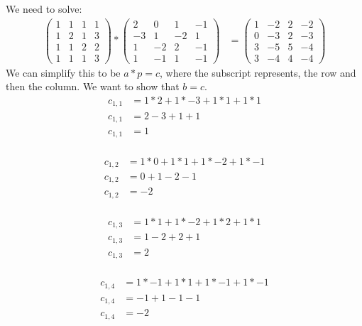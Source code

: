 \documentclass[12pt]{article}
\begin{document}
\begin{itemize}
We need to solve: 
\begin{align*}
    \begin{pmatrix}
    1 & 1 & 1 & 1\\
    1 & 2 & 1 & 3 \\
    1 & 1 & 2 & 2 \\
    1 & 1 & 1 & 3
    \end{pmatrix} *
    \begin{pmatrix}
    2 & 0 & 1 & -1\\
    -3 & 1 & -2 & 1 \\
    1 & -2 & 2 & -1 \\
    1 & -1 & 1 & -1
    \end{pmatrix} 
    &=  \begin{pmatrix}
    1 & -2 & 2 & -2\\
    0 & -3 & 2 & -3 \\
    3 & -5 & 5 & -4 \\
    3 & -4 & 4 & -4 
    \end{pmatrix}
\end{align*}
We can simplify this to be $a * p = c$, where the subscript represents, the row and then the column. We want to show that $b = c$.
\begin{align*}
    c_{1,1} &= 1 * 2 + 1 * -3 + 1 * 1 + 1 * 1 \\
    c_{1,1} &= 2 - 3 + 1 + 1 \\
    c_{1,1} &= 1 \\
\end{align*}

\begin{align*}
    c_{1,2} &= 1 * 0 + 1 * 1 + 1 * -2 + 1 * -1 \\
    c_{1,2} &= 0 + 1 - 2 - 1 \\
    c_{1,2} &= -2 \\
\end{align*}

\begin{align*}
    c_{1,3} &= 1 * 1 + 1 * -2 + 1 * 2 + 1 * 1 \\
    c_{1,3} &= 1 - 2 + 2 + 1 \\
    c_{1,3} &= 2 \\
\end{align*}

\begin{align*}
    c_{1,4} &= 1 * -1 + 1 * 1 + 1 * -1 + 1 * -1 \\
    c_{1,4} &= -1 + 1 - 1 - 1 \\
    c_{1,4} &= -2 \\
\end{align*}


\end{itemize}
\end{document}
